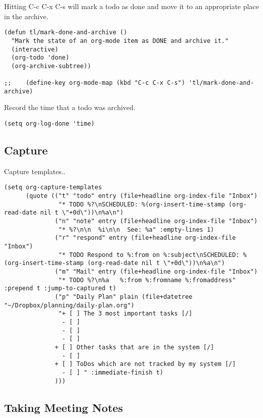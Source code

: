 \documentclass[12pt]{article}
\begin{document}
Hitting C-c C-x C-s will mark a todo as done and move it to an appropriate place
in the archive.

\lstset{language=Lisp,label= ,caption= ,numbers=none}
\begin{lstlisting}
(defun tl/mark-done-and-archive ()
  "Mark the state of an org-mode item as DONE and archive it."
  (interactive)
  (org-todo 'done)
  (org-archive-subtree))

;;    (define-key org-mode-map (kbd "C-c C-x C-s") 'tl/mark-done-and-archive)
\end{lstlisting}

Record the time that a todo was archived.

\lstset{language=Lisp,label= ,caption= ,numbers=none}
\begin{lstlisting}
(setq org-log-done 'time)
\end{lstlisting}

\subsection{Capture}
\label{sec-5-2}
Capture templates..
\lstset{language=Lisp,label= ,caption= ,numbers=none}
\begin{lstlisting}
(setq org-capture-templates
      (quote (("t" "todo" entry (file+headline org-index-file "Inbox")
               "* TODO %?\nSCHEDULED: %(org-insert-time-stamp (org-read-date nil t \"+0d\"))\n%a\n")
              ("n" "note" entry (file+headline org-index-file "Inbox")
               "* %?\n\n  %i\n\n  See: %a" :empty-lines 1)
              ("r" "respond" entry (file+headline org-index-file "Inbox")
               "* TODO Respond to %:from on %:subject\nSCHEDULED: %(org-insert-time-stamp (org-read-date nil t \"+0d\"))\n%a\n")
              ("m" "Mail" entry (file+headline org-index-file "Inbox")
               "* TODO %?\n%a   %:from %:fromname %:fromaddress" :prepend t :jump-to-captured t)
              ("p" "Daily Plan" plain (file+datetree "~/Dropbox/planning/daily-plan.org")
               "+ [ ] The 3 most important tasks [/]
                - [ ] 
                - [ ] 
                - [ ] 
              + [ ] Other tasks that are in the system [/]
                - [ ] 
              + [ ] ToDos which are not tracked by my system [/]
                - [ ] " :immediate-finish t)
              )))
\end{lstlisting}

\subsection{Taking Meeting Notes}
\label{sec-5-3}
\end{document}
